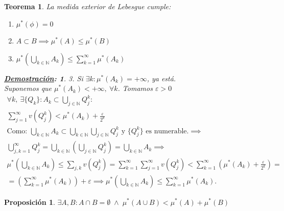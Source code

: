 \documentclass[10pt,a4paper,openright]{book}
\theoremstyle{break}
\newtheorem*{theo}{Teorema}
\newtheorem*{prop}{Proposición}
\newtheorem*{demo}{\underline{Demostración}:}
\begin{document}
\begin{theo}
    La medida exterior de Lebesgue cumple: 
    \begin{enumerate}
        \item $ \mu^*\left( \phi \right) = 0 $ 
        \item $A \subset B \implies \mu^*\left( A \right) \le \mu^*\left( B \right)$
        \item $ \mu^*\left( \bigcup_{k\in \mathbb{N}} A_k \right) \le \sum_{k=1}^{\infty} \mu^*\left( A_k \right)$
    \end{enumerate}
    \begin{demo}
        3. Si $\exists k: \mu^*\left( A_k \right) = +\infty$, ya está.\\
        Suponemos que $ \mu^*\left( A_k \right) < +\infty, \ \forall k$. Tomamos $ \varepsilon>0$
        \begin{gather*}
            \forall k, \ \exists \{Q_k\}: A_k \subset \bigcup_{j \in \mathbb{N}} Q_j^{k} : \\
            \sum_{j=1}^{\infty} v\left( Q_j^k \right) < \mu^*\left( A_k \right) + \frac{\varepsilon}{2^k}\\
            \text{Como: } \bigcup_{k \in \mathbb{N}} A_k \subset \bigcup_{k \in \mathbb{N}} \bigcup_{j \in \mathbb{N}} Q_j^k 
            \text{ y } \{Q_j^k\} \text{ es numerable.} \implies \\
            \bigcup_{j, k = 1} ^{\infty} Q_j^k = \bigcup_{k \in \mathbb{N}}\left( \bigcup_{j \in \mathbb{N}}Q_j^k  \right) = \bigcup_{k \in \mathbb{N}} A_k \implies\\
            \mu^*\left( \bigcup_{k\in \mathbb{N}} A_k \right) \le \sum_{j, k} v\left( Q_j^k \right) = \sum_{k=1}^{\infty} \sum_{j=1}^{\infty} v\left( Q_j^k \right) < 
            \sum_{k=1}^{\infty} \left( \mu^*\left( A_k \right) + \frac{\varepsilon}{2^k} \right) = \\
            = \left( \sum_{k=1}^{\infty} \mu^*\left( A_k \right) \right) + \varepsilon \implies 
            \mu^*\left( \bigcup_{k \in \mathbb{N}}A_k   \right) \le \sum_{k=1}^{\infty} \mu^*\left( A_k \right)
        .\end{gather*}
    \end{demo}
\end{theo}

\begin{prop}
    $\exists A, B: A\cap B = \emptyset\; \land \;\mu^*\left( A\cup B \right) < \mu^*\left( A \right) + \mu^*\left( B \right)$
\end{prop}
\end{document}
